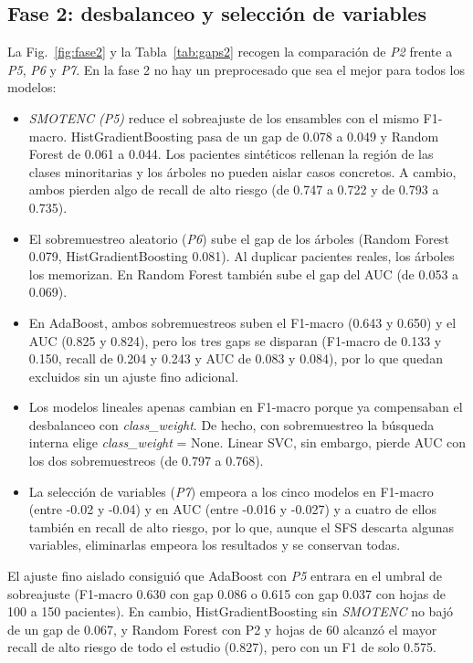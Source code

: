 \documentclass[journal,onecolumn]{IEEEtran}
\begin{document}
\subsection{Fase 2: desbalanceo y selección de variables}

La Fig.~\ref{fig:fase2} y la Tabla~\ref{tab:gaps2} recogen la comparación de \textit{P2} frente a \textit{P5}, \textit{P6} y \textit{P7}. En la fase 2 no hay un preprocesado que sea el mejor para todos los modelos:

\begin{itemize}
    \item \textit{SMOTENC (P5)} reduce el sobreajuste de los ensambles con el mismo F1-macro. HistGradientBoosting pasa de un gap de 0.078 a 0.049 y Random Forest de 0.061 a 0.044. Los pacientes sintéticos rellenan la región de las clases minoritarias y los árboles no pueden aislar casos concretos. A cambio, ambos pierden algo de recall de alto riesgo (de 0.747 a 0.722 y de 0.793 a 0.735).
    \item El sobremuestreo aleatorio (\textit{P6}) sube el gap de los árboles (Random Forest 0.079, HistGradientBoosting 0.081). Al duplicar pacientes reales, los árboles los memorizan. En Random Forest también sube el gap del AUC (de 0.053 a 0.069).
    \item En AdaBoost, ambos sobremuestreos suben el F1-macro (0.643 y 0.650) y el AUC (0.825 y 0.824), pero los tres gaps se disparan (F1-macro de 0.133 y 0.150, recall de 0.204 y 0.243 y AUC de 0.083 y 0.084), por lo que quedan excluidos sin un ajuste fino adicional.
    \item Los modelos lineales apenas cambian en F1-macro porque ya compensaban el desbalanceo con \textit{class\_weight}. De hecho, con sobremuestreo la búsqueda interna elige \textit{class\_weight} = None. Linear SVC, sin embargo, pierde AUC con los dos sobremuestreos (de 0.797 a 0.768).
    \item La selección de variables (\textit{P7}) empeora a los cinco modelos en F1-macro (entre -0.02 y -0.04) y en AUC (entre -0.016 y -0.027) y a cuatro de ellos también en recall de alto riesgo, por lo que, aunque el SFS descarta algunas variables, eliminarlas empeora los resultados y se conservan todas.
\end{itemize}

El ajuste fino aislado consiguió que AdaBoost con \textit{P5} entrara en el umbral de sobreajuste (F1-macro 0.630 con gap 0.086 o 0.615 con gap 0.037 con hojas de 100 a 150 pacientes). En cambio, HistGradientBoosting sin \textit{SMOTENC} no bajó de un gap de 0.067, y Random Forest con P2 y hojas de 60 alcanzó el mayor recall de alto riesgo de todo el estudio (0.827), pero con un F1 de solo 0.575.
\end{document}
